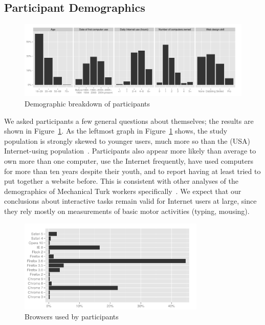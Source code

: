\documentclass[conference]{IEEEtran}
\begin{document}
\subsection{Participant Demographics}\label{sec:demog}

\begin{figure}
\centerline{\includegraphics[width=7in]{demog}}
\caption{Demographic breakdown of participants}\label{fig:demographics}
\end{figure}

We asked participants a few general questions about themselves; the
results are shown in Figure~\ref{fig:demographics}.  As the leftmost
graph in Figure~\ref{fig:demographics} shows, the study population is
strongly skewed to younger users, much more so than the (USA)
Internet-using population~\cite{pew_demog}.  Participants also appear
more likely than average to own more than one computer, use the
Internet frequently, have used computers for more than ten years
despite their youth, and to report having at least tried to put
together a website before.  This is consistent with other analyses of
the demographics of Mechanical Turk workers
specifically~\cite{mturk_demog,mturk_shift}.  We expect that our
conclusions about interactive tasks remain valid for Internet users at
large, since they rely mostly on measurements of basic motor
activities (typing, mousing).

\begin{figure}
\centerline{\includegraphics[width=3.5in]{browser}}
\caption{Browsers used by participants}\label{fig:browsers}
\end{figure}
\end{document}
